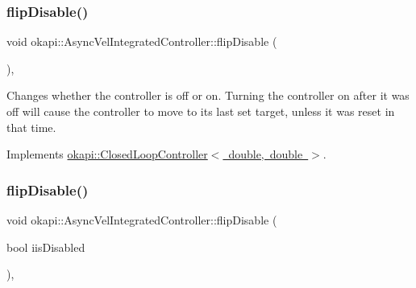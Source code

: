 \mbox{\label{classokapi_1_1AsyncVelIntegratedController_ab75c1617544e0817949df5998fa2a8d7}} 
\subsubsection{\texorpdfstring{flipDisable()}{flipDisable()}\hspace{0.1cm}{\footnotesize\ttfamily [1/2]}}
{\footnotesize\ttfamily void okapi\+::\+Async\+Vel\+Integrated\+Controller\+::flip\+Disable (\begin{DoxyParamCaption}{ }\end{DoxyParamCaption})\hspace{0.3cm}{\ttfamily [override]}, {\ttfamily [virtual]}}

Changes whether the controller is off or on. Turning the controller on after it was off will cause the controller to move to its last set target, unless it was reset in that time. 

Implements \mbox{\hyperlink{classokapi_1_1ClosedLoopController_a9de69b60885df41cd2164fe1a23f34d3}{okapi\+::\+Closed\+Loop\+Controller$<$ double, double $>$}}.

\mbox{\label{classokapi_1_1AsyncVelIntegratedController_a1e906e904500fe920ea4cad6a922b523}} 
\subsubsection{\texorpdfstring{flipDisable()}{flipDisable()}\hspace{0.1cm}{\footnotesize\ttfamily [2/2]}}
{\footnotesize\ttfamily void okapi\+::\+Async\+Vel\+Integrated\+Controller\+::flip\+Disable (\begin{DoxyParamCaption}\item[{bool}]{iis\+Disabled }\end{DoxyParamCaption})\hspace{0.3cm}{\ttfamily [override]}, {\ttfamily [virtual]}}

